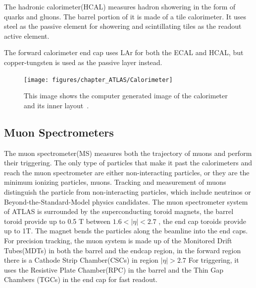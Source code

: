The hadronic calorimeter(HCAL) measures hadron showering in the form of quarks and gluons. The barrel portion of it is made of a tile calorimeter. It uses steel as the passive element for showering and scintillating tiles as the readout active element. 

The forward calorimeter end cap uses LAr for both the ECAL and HCAL, but copper-tungsten is used as the passive layer instead. 


\begin{figure}[!htb]
    \begin{center}
        \texttt{[image: figures/chapter\_ATLAS/Calorimeter]}
        \caption{
            This image shows the computer generated image of the calorimeter and its inner layout~\cite{Pequenao:1095927}.
        }
        \label{fig:Calorimeter}
    \end{center}
\end{figure}

\subsection{Muon Spectrometers}
The muon spectrometer(MS) measures both the trajectory of muons and perform their triggering. The only type of particles that make it past the calorimeters and reach the muon spectrometer are either non-interacting particles, or they are the minimum ionizing particles, muons. Tracking and measurement of muons distinguish the particle from non-interacting particles, which include neutrinos or Beyond-the-Standard-Model physics candidates.
The muon spectrometer system of ATLAS is surrounded by the superconducting toroid magnets, the barrel toroid provide up to 0.5 T between $1.6 < |\eta|<2.7$ , the end cap toroids provide up to 1T. The magnet bends the particles along the beamline into the end caps.
For precision tracking, the muon system is made up of the Monitored Drift Tubes(MDTs) in both the barrel and the endcap region, in the forward region there is a Cathode Strip Chamber(CSCs) in region $|\eta|>2.7$
For triggering, it uses the Resistive Plate Chamber(RPC) in the barrel and the Thin Gap Chambers (TGCs) in the end cap for fast readout. 


